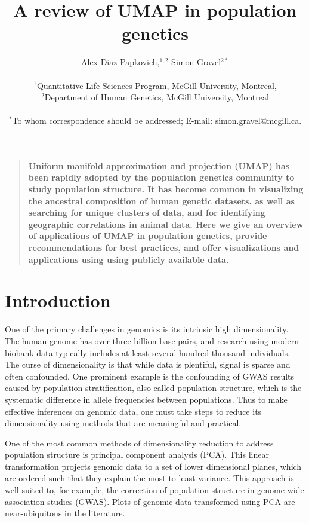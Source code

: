 \documentclass[12pt]{article}
\title{A review of UMAP in population genetics}
\author
{Alex Diaz-Papkovich,$^{1,2}$ Simon Gravel$^{2\ast}$\\
\\
\normalsize{$^{1}$Quantitative Life Sciences Program, McGill University, Montreal,}\\
\normalsize{$^{2}$Department of Human Genetics, McGill University, Montreal}\\
\\
\normalsize{$^\ast$To whom correspondence should be addressed; E-mail:  simon.gravel@mcgill.ca.}
}
\date{}
\newenvironment{sciabstract}{%
\begin{quote} \bf}
{\end{quote}}
\begin{document}
 


\baselineskip24pt


\maketitle 



\begin{sciabstract}
Uniform manifold approximation and projection (UMAP) has been rapidly adopted by the population genetics community to study population structure. It has become common in visualizing the ancestral composition of human genetic datasets, as well as searching for unique clusters of data, and for identifying geographic correlations in animal data. Here we give an overview of applications of UMAP in population genetics, provide recommendations for best practices, and offer visualizations and applications using using publicly available data.
\end{sciabstract}

\section*{Introduction}
One of the primary challenges in genomics is its intrinsic high dimensionality. The human genome has over three billion base pairs, and research using modern biobank data typically includes at least several hundred thousand individuals. The curse of dimensionality is that while data is plentiful, signal is sparse and often confounded. One prominent example is the confounding of GWAS results caused by population stratification, also called population structure, which is the systematic difference in allele frequencies between populations. Thus to make effective inferences on genomic data, one must take steps to reduce its dimensionality using methods that are meaningful and practical. 

One of the most common methods of dimensionality reduction to address population structure is principal component analysis (PCA). This linear transformation projects genomic data to a set of lower dimensional planes, which are ordered such that they explain the most-to-least variance. This approach is well-suited to, for example, the correction of population structure in genome-wide association studies (GWAS).\cite{patterson2006population} Plots of genomic data transformed using PCA are near-ubiquitous in the literature.
\end{document}
